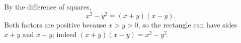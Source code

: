 By the difference of squares,
\[
x^2-y^2=(x+y)(x-y).
\]
Both factors are positive because $x>y>0$, so the rectangle can have sides $\boxed{x+y\text{ and }x-y}$; indeed $(x+y)(x-y)=x^2-y^2$.
